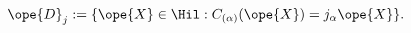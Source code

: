 \begin{equation}	\label{5.9}
\ope{D}_j
:= \{ \ope{X}\in\Hil : C_{(\alpha)}(\ope{X}) = j_\alpha \ope{X} \}.
	\end{equation}

